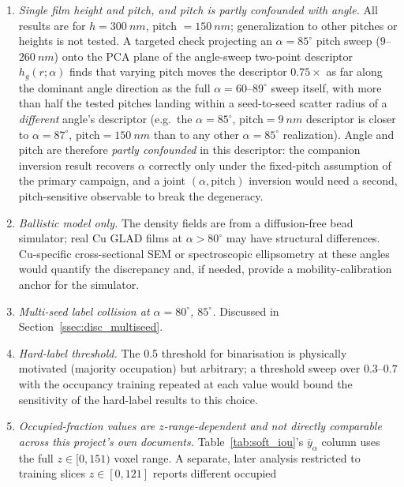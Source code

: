 \documentclass[aip,amsmath,amssymb,reprint]{revtex4-1}
\renewcommand{\ang}{\ensuremath{\alpha}} %
\begin{document}
\begin{enumerate}
  \item \textit{Single film height and pitch, and pitch is partly
    confounded with angle.} All results are for $h = \SI{300}{nm}$,
    pitch $= \SI{150}{nm}$; generalization to other pitches or heights is
    not tested. A targeted check projecting an $\ang=85^{\circ}$
    pitch sweep ($9$--$\SI{260}{nm}$) onto the PCA plane of the
    angle-sweep two-point descriptor $h_g(r;\ang)$ finds that varying
    pitch moves the descriptor $0.75\times$ as far along the dominant
    angle direction as the full $\ang=60$--$89^{\circ}$ sweep itself,
    with more than half the tested pitches landing within a
    seed-to-seed scatter radius of a \emph{different} angle's
    descriptor (e.g.\ the $\ang=85^{\circ}$, pitch$=\SI{9}{nm}$
    descriptor is closer to $\ang=87^{\circ}$, pitch$=\SI{150}{nm}$
    than to any other $\ang=85^{\circ}$ realization). Angle and pitch
    are therefore \emph{partly confounded} in this descriptor: the
    companion inversion result \citep{companionP1} recovers $\ang$
    correctly only under the fixed-pitch assumption of the primary
    campaign, and a joint $(\ang,\text{pitch})$ inversion would need a
    second, pitch-sensitive observable to break the degeneracy.
  \item \textit{Ballistic model only.} The density fields are from
    a diffusion-free bead simulator; real Cu GLAD films at
    $\ang > 80^{\circ}$ may have structural differences. Cu-specific
    cross-sectional SEM or spectroscopic ellipsometry at these angles would
    quantify the discrepancy and, if needed, provide a mobility-calibration
    anchor for the simulator.
  \item \textit{Multi-seed label collision at $\ang = 80^{\circ}$, $85^{\circ}$.}
    Discussed in Section~\ref{ssec:disc_multiseed}.
  \item \textit{Hard-label threshold.} The 0.5 threshold for
    binarisation is physically motivated (majority occupation) but
    arbitrary; a threshold sweep over $0.3$--$0.7$ with the occupancy
    training repeated at each value would bound the sensitivity of the
    hard-label results to this choice.
  \item \textit{Occupied-fraction values are $z$-range-dependent and
    not directly comparable across this project's own documents.}
    Table~\ref{tab:soft_iou}'s $\bar{y}_\alpha$ column uses the full
    $z\in[0,151)$ voxel range. A separate, later analysis restricted
    to training slices $z\in[0,121]$ reports different occupied

\end{enumerate}
\end{document}

